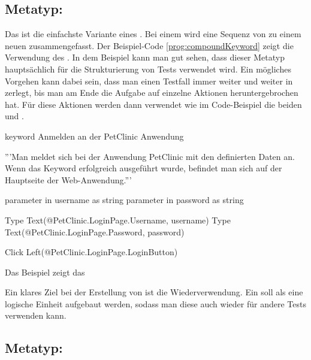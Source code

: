 \subsection{Metatyp: }

Das  ist die einfachste Variante eines . Bei einem  wird eine Sequenz von  zu einem neuen  zusammengefasst. Der Beispiel-Code \ref{prog:compoundKeyword} zeigt die Verwendung des  . In dem Beispiel kann man gut sehen, dass dieser Metatyp hauptsächlich für die Strukturierung von Tests verwendet wird. Ein mögliches Vorgehen kann dabei sein, dass man einen Testfall immer weiter und weiter in  zerlegt, bis man am Ende die Aufgabe auf einzelne Aktionen heruntergebrochen hat. Für diese Aktionen werden dann  verwendet wie im Code-Beispiel die beiden   und .

\begin{program}
\begin{JavaCode}
keyword Anmelden an der PetClinic Anwendung {
	'''Man meldet sich bei der Anwendung PetClinic mit den definierten 
	   Daten an. Wenn das Keyword erfolgreich ausgeführt wurde, 
	   befindet man sich auf der Hauptseite der Web-Anwendung.'''
	
	parameter in username as string
	parameter in password as string
	
	Type Text(@PetClinic.LoginPage.Username, username)
	Type Text(@PetClinic.LoginPage.Password, password)
	
	Click Left(@PetClinic.LoginPage.LoginButton)
}
\end{JavaCode}
\caption{Das Beispiel zeigt das  }
\label{prog:compoundKeyword}
\end{program}

\SuperPar
Ein klares Ziel bei der Erstellung von  ist die Wiederverwendung. Ein  soll als eine logische Einheit aufgebaut werden, sodass man diese auch wieder für andere Tests verwenden kann. 


\subsection{Metatyp: }

